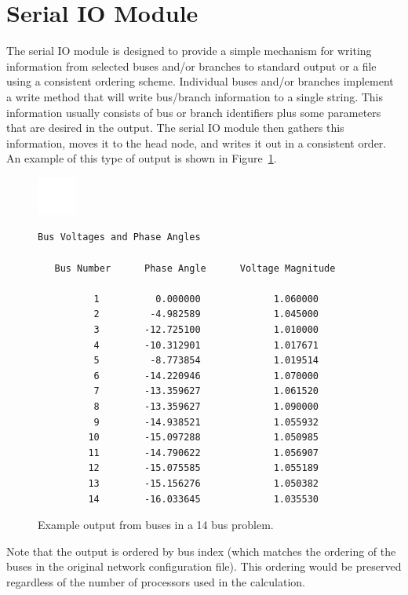 \section{Serial IO Module}

The serial IO module is designed to provide a simple mechanism for writing
information from selected buses and/or branches to standard output or a file
using a consistent ordering scheme. Individual buses and/or branches implement a
write method that will write bus/branch information to a single string. This
information usually consists of bus or branch identifiers plus some parameters
that are desired in the output. The serial IO module then gathers this
information, moves it to the head node, and writes it out in a consistent order.
An example of this type of output is shown in Figure~\ref{fig:serial_out}.

\begin{figure}
  \centering
    \includegraphics*[width=0.5in, height=0.5in, keepaspectratio=true]{figures/20pix-white-square}

{
\color{red}
\bfseries
\begin{Verbatim}[commandchars=\\\{\}]
   Bus Voltages and Phase Angles

   Bus Number      Phase Angle      Voltage Magnitude

          1          0.000000             1.060000
          2         -4.982589             1.045000
          3        -12.725100             1.010000
          4        -10.312901             1.017671
          5         -8.773854             1.019514
          6        -14.220946             1.070000
          7        -13.359627             1.061520
          8        -13.359627             1.090000
          9        -14.938521             1.055932
         10        -15.097288             1.050985
         11        -14.790622             1.056907
         12        -15.075585             1.055189
         13        -15.156276             1.050382
         14        -16.033645             1.035530
\end{Verbatim}
}
  \caption{Example output from buses in a 14 bus problem.}
  \label{fig:serial_out}
\end{figure}

Note that the output is ordered by bus index (which matches the ordering of the buses in the original network configuration file). This ordering would be preserved regardless of the number of processors used in the calculation.

